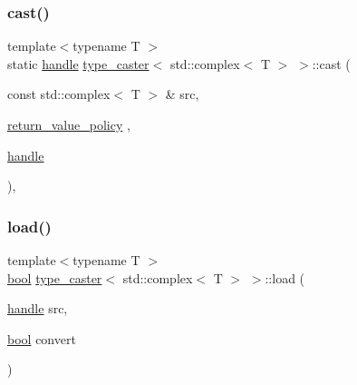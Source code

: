 \subsubsection{\texorpdfstring{cast()}{cast()}}
{\footnotesize\ttfamily template$<$typename T $>$ \\
static \mbox{\hyperlink{classhandle}{handle}} \mbox{\hyperlink{classtype__caster}{type\+\_\+caster}}$<$ std\+::complex$<$ T $>$ $>$\+::cast (\begin{DoxyParamCaption}\item[{const std\+::complex$<$ T $>$ \&}]{src,  }\item[{\mbox{\hyperlink{detail_2common_8h_adde72ab1fb0dd4b48a5232c349a53841}{return\+\_\+value\+\_\+policy}}}]{,  }\item[{\mbox{\hyperlink{classhandle}{handle}}}]{ }\end{DoxyParamCaption})\hspace{0.3cm}{\ttfamily [inline]}, {\ttfamily [static]}}

\mbox{\label{classtype__caster_3_01std_1_1complex_3_01_t_01_4_01_4_a0358066accceb09dc3e88f9a50f0fb00}} 
\subsubsection{\texorpdfstring{load()}{load()}}
{\footnotesize\ttfamily template$<$typename T $>$ \\
\mbox{\hyperlink{asdl_8h_af6a258d8f3ee5206d682d799316314b1}{bool}} \mbox{\hyperlink{classtype__caster}{type\+\_\+caster}}$<$ std\+::complex$<$ T $>$ $>$\+::load (\begin{DoxyParamCaption}\item[{\mbox{\hyperlink{classhandle}{handle}}}]{src,  }\item[{\mbox{\hyperlink{asdl_8h_af6a258d8f3ee5206d682d799316314b1}{bool}}}]{convert }\end{DoxyParamCaption})\hspace{0.3cm}{\ttfamily [inline]}}

\mbox{\label{classtype__caster_3_01std_1_1complex_3_01_t_01_4_01_4_a58b7128eed3564ae4060242f99c8dd61}} 
